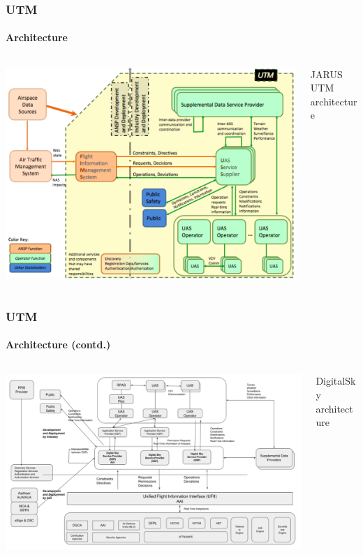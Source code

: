 \documentclass[usenames,dvipsnames,aspectratio=169,serif]{beamer}
\begin{document}
\begin{frame}
   \frametitle{UTM}
   \framesubtitle{Architecture}
   \begin{columns}[T]
      \begin{column}{0.6\textwidth}
         \includegraphics[height=0.75\textheight]{img/utm-architecture.png}
      \end{column}
      \begin{column}{0.4\textwidth}
         JARUS UTM architecture \cite{JARUS-SORA/JAR-DEL-WG6-D.04}
      \end{column}
   \end{columns}

\end{frame}


\begin{frame}
   \frametitle{UTM}
   \framesubtitle{Architecture (contd.)}
   \begin{columns}[T]
      \begin{column}{0.6\textwidth}
         \includegraphics[height=0.75\textheight]{img/digitalsky-arch.png}
      \end{column}
      \begin{column}{0.4\textwidth}
         DigitalSky\texttrademark \, architecture \cite{RPASGM2020}
      \end{column}
   \end{columns}

\end{frame}
\end{document}
